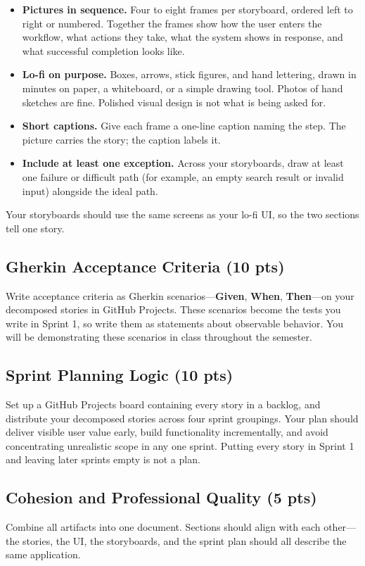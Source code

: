 \documentclass[11pt]{article}
\begin{document}
\begin{itemize}
    \item \textbf{Pictures in sequence.} Four to eight frames per storyboard, ordered left to right or numbered. Together the frames show how the user enters the workflow, what actions they take, what the system shows in response, and what successful completion looks like.
    \item \textbf{Lo-fi on purpose.} Boxes, arrows, stick figures, and hand lettering, drawn in minutes on paper, a whiteboard, or a simple drawing tool. Photos of hand sketches are fine. Polished visual design is not what is being asked for.
    \item \textbf{Short captions.} Give each frame a one-line caption naming the step. The picture carries the story; the caption labels it.
    \item \textbf{Include at least one exception.} Across your storyboards, draw at least one failure or difficult path (for example, an empty search result or invalid input) alongside the ideal path.
\end{itemize}

Your storyboards should use the same screens as your lo-fi UI, so the two sections tell one story.

\subsection{Gherkin Acceptance Criteria (10 pts)}
Write acceptance criteria as Gherkin scenarios---\textbf{Given}, \textbf{When}, \textbf{Then}---on your decomposed stories in GitHub Projects. These scenarios become the tests you write in Sprint 1, so write them as statements about observable behavior. You will be demonstrating these scenarios in class throughout the semester.

\subsection{Sprint Planning Logic (10 pts)}
Set up a GitHub Projects board containing every story in a backlog, and distribute your decomposed stories across four sprint groupings. Your plan should deliver visible user value early, build functionality incrementally, and avoid concentrating unrealistic scope in any one sprint. Putting every story in Sprint 1 and leaving later sprints empty is not a plan.

\subsection{Cohesion and Professional Quality (5 pts)}
Combine all artifacts into one document. Sections should align with each other---the stories, the UI, the storyboards, and the sprint plan should all describe the same application.
\end{document}
